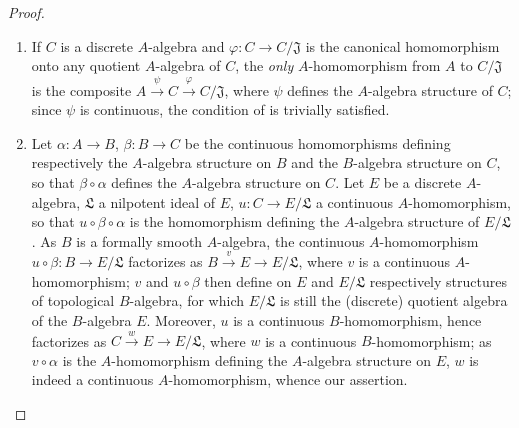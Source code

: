 \begin{proof}
\begin{enumerate}
  \item[(i)] If $C$ is a discrete $A$-algebra and
  $\varphi:C\to C/\mathfrak{J}$ is the canonical homomorphism onto any
  quotient $A$-algebra of $C$, the \emph{only} $A$-homomorphism from $A$ to
  $C/\mathfrak{J}$ is the composite
  $A\xrightarrow{\psi}C\xrightarrow{\varphi}C/\mathfrak{J}$, where $\psi$
  defines the $A$-algebra structure of $C$; since $\psi$ is continuous, the
  condition of  is trivially satisfied.

  \item[(ii)] Let $\alpha:A\to B$, $\beta:B\to C$ be the continuous
  homomorphisms defining respectively the $A$-algebra structure on $B$ and the
  $B$-algebra structure on $C$, so that $\beta\circ\alpha$ defines the
  $A$-algebra structure on $C$. Let $E$ be a discrete $A$-algebra,
  $\mathfrak{L}$ a nilpotent ideal of $E$, $u:C\to E/\mathfrak{L}$ a
  continuous $A$-homomorphism, so that $u\circ\beta\circ\alpha$ is the
  homomorphism defining the $A$-algebra structure of $E/\mathfrak{L}$. As $B$
  is a formally smooth $A$-algebra, the continuous $A$-homomorphism
  $u\circ\beta:B\to E/\mathfrak{L}$ factorizes as
  $B\xrightarrow{v}E\to E/\mathfrak{L}$, where $v$ is a continuous
  $A$-homomorphism; $v$ and $u\circ\beta$ then define on $E$ and
  $E/\mathfrak{L}$ respectively structures of topological $B$-algebra, for
  which $E/\mathfrak{L}$ is
  still the (discrete) quotient algebra of the $B$-algebra $E$. Moreover,
  $u$ is a continuous $B$-homomorphism, hence factorizes as
  $C\xrightarrow{w}E\to E/\mathfrak{L}$, where $w$ is a continuous
  $B$-homomorphism; as $v\circ\alpha$ is the $A$-homomorphism defining the
  $A$-algebra structure on $E$, $w$ is indeed a continuous $A$-homomorphism,
  whence our assertion.


\end{enumerate}
\end{proof}

